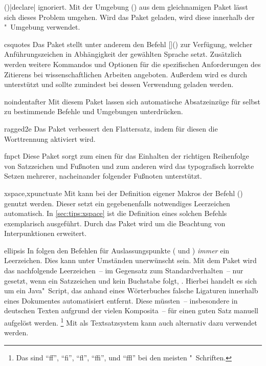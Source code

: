 \begin{packages}
  ()|declare| ignoriert. 
  Mit der Umgebung () aus dem 
  gleichnamigen Paket lässt sich dieses Problem umgehen. Wird das Paket 
  geladen, wird diese innerhalb der "~Umgebung verwendet.
\item[csquotes]
  Das Paket stellt unter anderem den Befehl 
  []() zur Verfügung, welcher 
  Anführungszeichen in Abhängigkeit der gewählten Sprache setzt. Zusätzlich 
  werden weitere Kommandos und Optionen für die spezifischen Anforderungen des 
  Zitierens bei wissenschaftlichen Arbeiten angeboten. Außerdem wird es durch 
   unterstützt und sollte zumindest bei dessen Verwendung 
  geladen werden.
\item[noindentafter]
  Mit diesem Paket lassen sich automatische Absatzeinzüge für selbst zu 
  bestimmende Befehle und Umgebungen unterdrücken.
\item[ragged2e]
  Das Paket verbessert den Flattersatz, indem für diesen die Worttrennung 
  aktiviert wird.
\item[fnpct]
  Diese Paket sorgt zum einen für das Einhalten der richtigen Reihenfolge von 
  Satzzeichen und Fußnoten und zum anderen wird das typografisch korrekte 
  Setzen mehrerer, nacheinander folgender Fußnoten unterstützt.
\item[xspace,xpunctuate]
  Mit  kann bei der Definition eigener Makros der Befehl 
  () genutzt werden. Dieser setzt ein 
  gegebenenfalls notwendiges Leerzeichen automatisch. In 
  \autoref{sec:tips:xspace} ist die Definition eines solchen Befehls 
  exemplarisch ausgeführt. Durch das Paket  wird 
   um die Beachtung von Interpunktionen erweitert.
\item[ellipsis]
  In  folgen den Befehlen für Auslassungspunkte ( und 
  ) \emph{immer} ein Leerzeichen. Dies kann unter Umständen 
  unerwünscht sein. Mit dem Paket  wird das nachfolgende 
  Leerzeichen~-- im Gegensatz zum Standardverhalten~-- nur gesetzt, wenn ein 
  Satzzeichen und kein Buchstabe folgt, .
  Hierbei handelt es sich um ein Java"~Script, das anhand eines Wörterbuches 
  falsche Ligaturen innerhalb eines Dokumentes automatisiert entfernt. Diese 
  müssten~-- insbesondere in deutschen Texten aufgrund der vielen Komposita~-- 
  für einen guten Satz manuell aufgelöst werden.%
  \footnote{%
    Das sind \enquote{ff}, \enquote{fi}, \enquote{fl}, \enquote{ffi}, und 
    \enquote{ffl} bei den meisten "~Schriften.%
  }
  Mit  als Textsatzsystem kann auch  
  alternativ dazu verwendet werden.
%
\end{packages}


